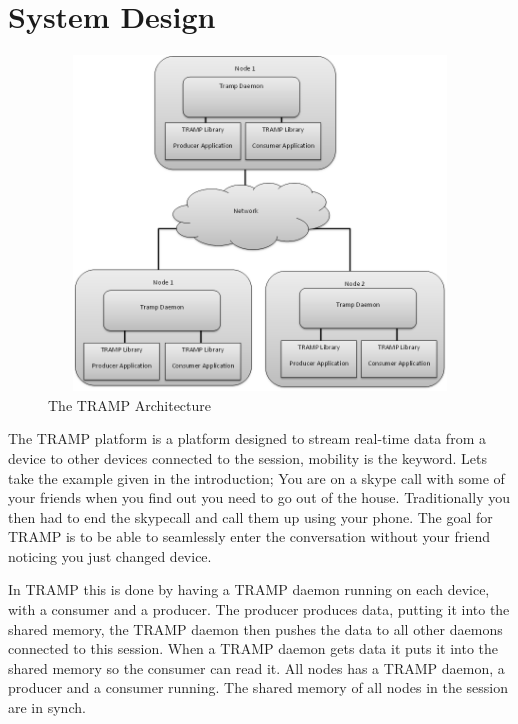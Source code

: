 \section{System Design}
\label{sec:design}

\begin{center}
\begin{figure}[ht!]
 \centering
 \includegraphics[width=6.0in, height=3.5in]{tramp_arch2.png}
\caption{The TRAMP Architecture}
\end{figure}
\end{center}

The TRAMP platform is a platform designed to stream real-time data from a device to other devices connected to the session, mobility is the keyword. Lets take the example given in the introduction; You are on a skype call with some of your friends when you find out you need to go out of the house. Traditionally you then had to end the skypecall and call them up using your phone. The goal for TRAMP is to be able to seamlessly enter the conversation without your friend noticing you just changed device.

In TRAMP this is done by having a TRAMP daemon running on each device, with a consumer and a producer. The producer produces data, putting it into the shared memory, the TRAMP daemon then pushes the data to all other daemons connected to this session. When a TRAMP daemon gets data it puts it into the shared memory so the consumer can read it. All nodes has a TRAMP daemon, a producer and a consumer running. The shared memory of all nodes in the session are in synch.

